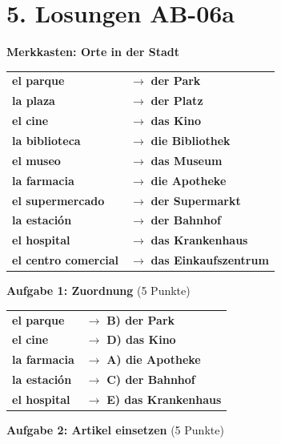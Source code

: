 \documentclass[11pt, a4paper]{article}
\newcommand{\fachfarbe}{spanisch}
\newcommand{\sequenz}{06}
\newcommand{\block}{a}
\newcommand{\loesung}[1]{\textcolor{loesung}{\textbf{#1}}}
\newcommand{\es}[1]{\textcolor{\fachfarbe}{\textbf{#1}}}
\begin{document}

\section*{5. Losungen AB-\sequenz\block}

\textbf{Merkkasten: Orte in der Stadt}

\begin{tabular}{ll}
\es{el parque} & $\rightarrow$ \loesung{der Park} \\
\es{la plaza} & $\rightarrow$ \loesung{der Platz} \\
\es{el cine} & $\rightarrow$ \loesung{das Kino} \\
\es{la biblioteca} & $\rightarrow$ \loesung{die Bibliothek} \\
\es{el museo} & $\rightarrow$ \loesung{das Museum} \\
\es{la farmacia} & $\rightarrow$ \loesung{die Apotheke} \\
\es{el supermercado} & $\rightarrow$ \loesung{der Supermarkt} \\
\es{la estación} & $\rightarrow$ \loesung{der Bahnhof} \\
\es{el hospital} & $\rightarrow$ \loesung{das Krankenhaus} \\
\es{el centro comercial} & $\rightarrow$ \loesung{das Einkaufszentrum} \\
\end{tabular}

\vspace{1em}

\textbf{Aufgabe 1: Zuordnung} (5 Punkte)

\begin{tabular}{ll}
\es{el parque} & $\rightarrow$ \loesung{B) der Park} \\
\es{el cine} & $\rightarrow$ \loesung{D) das Kino} \\
\es{la farmacia} & $\rightarrow$ \loesung{A) die Apotheke} \\
\es{la estación} & $\rightarrow$ \loesung{C) der Bahnhof} \\
\es{el hospital} & $\rightarrow$ \loesung{E) das Krankenhaus} \\
\end{tabular}

\vspace{1em}

\textbf{Aufgabe 2: Artikel einsetzen} (5 Punkte)
\end{document}
